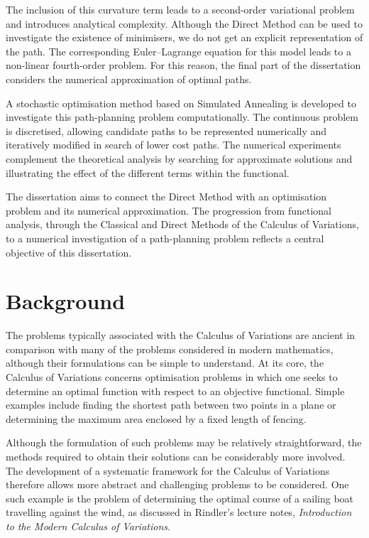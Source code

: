 The inclusion of this curvature term leads to a second-order variational problem and introduces analytical complexity. Although the Direct Method can be used to investigate the existence of minimisers, we do not get an explicit representation of the path. The corresponding Euler--Lagrange equation for this model leads to a non-linear fourth-order problem. For this reason, the final part of the dissertation considers the numerical approximation of optimal paths.

A stochastic optimisation method based on Simulated Annealing is developed to investigate this path-planning problem computationally. The continuous problem is discretised, allowing candidate paths to be represented numerically and iteratively modified in search of lower cost paths. The numerical experiments complement the theoretical analysis by searching for approximate solutions and illustrating the effect of the different terms within the functional.

The dissertation aims to connect the Direct Method with an optimisation problem and its numerical approximation. The progression from functional analysis, through the Classical and Direct Methods of the Calculus of Variations, to a numerical investigation of a path-planning problem reflects a central objective of this dissertation. 

\section{Background}
\label{sec:backgound}

The problems typically associated with the Calculus of Variations are ancient in comparison with many of the problems considered in modern mathematics, although their formulations can be   simple to understand. At its core, the Calculus of Variations concerns optimisation problems in which one seeks to determine an optimal function with respect to an objective functional. Simple examples include finding the shortest path between two points in a plane or determining the maximum area enclosed by a fixed length of fencing.

Although the formulation of such problems may be relatively straightforward, the methods required to obtain their solutions can be considerably more involved. The development of a systematic framework for the Calculus of Variations therefore allows more abstract and challenging problems to be considered. One such example is the problem of determining the optimal course of a sailing boat travelling against the wind, as discussed in Rindler’s lecture notes, \textit{Introduction to the Modern Calculus of Variations}.\cite{rindler}

